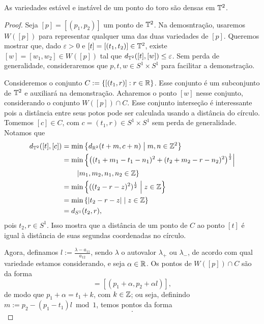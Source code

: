 \begin{proposition}
As variedades estável e instável de um ponto do toro são densas em $\mathbb{T}^2$.	\end{proposition}
\begin{proof}
Seja $[p]=[(p_1,p_2)]$ um ponto de $\mathbb{T}^2$. Na demosntração, usaremos $W([p])$ para representar qualquer uma das duas variedades de $[p]$. Queremos mostrar que, dado $\varepsilon > 0$ e $[t]=[(t_1,t_2)] \in \mathbb{T}^2$, existe $[w]=[w_1,w_2] \in W([p])$ tal que $d_{\mathbb{T}^2}([t],[w]) \leq \varepsilon$. Sem perda de generalidade, consideraremos que $p,t,w \in S^1 \times S^1$ para facilitar a demonstração.

Consideremos o conjunto $C := \{[(t_1,r)] : r \in \mathbb{R} \}$. Esse conjunto é um subconjunto de $\mathbb{T}^2$ e auxiliará na demonstração. Acharemos o ponto $[w]$ nesse conjunto, considerando o conjunto $W([p]) \cap C$. Esse conjunto interseção é interessante pois a distância entre seus potos pode ser calculada usando a distância do círculo. Tomemos $[c] \in C$, com $c=(t_1,r) \in S^1 \times S^1$ sem perda de generalidade. Notamos que
	\begin{align*}
		d_{\mathbb{T}^2}([t],[c])& = \min\left\{{d_{\mathbb{R}^2}(t+m,c+n)}\;\middle\vert\;{m,n \in \mathbb{Z}^2}\right\} \\
			& = \min \left\{ \big((t_1+m_1-t_1-n_1)^2 + (t_2+m_2-r-n_2)^2 \big)^{\frac{1}{2}} \right| \\
			&\qquad \left| m_1,m_2,n_1,n_2 \in \mathbb{Z} \right\} \\
			& = \min\left\{{((t_2-r-z)^2)^{\frac{1}{2}}}\;\middle\vert\;{z \in \mathbb{Z}}\right\} \\
			& = \min\left\{{\left\vert{t_2-r-z}\right\vert}\;\middle\vert\;{z \in \mathbb{Z}}\right\} \\
			& = d_{S^1}(t_2,r),
	\end{align*}
pois $t_2, r \in S^1$. Isso mostra que a distância de um ponto de $C$ ao ponto $[t]$ é igual à distância de suas segundas coordenadas no círculo.

Agora, definamos $l := \frac{\lambda - a_{11}}{a_{12}}$, sendo $\lambda$ o autovalor $\lambda_+$ ou $\lambda_-$, de acordo com qual variedade estamos considerando, e seja $\alpha \in \mathbb{R}$. Os pontos de $W([p]) \cap C$ são da forma
	\begin{equation*}
	[p + \alpha v_\lambda] = [(p_1 + \alpha, p_2 + \alpha l)],
	\end{equation*}
de modo que $p_1 + \alpha = t_1 + k$, com $k \in \mathbb{Z}$; ou seja, definindo $m := p_2 - (p_1 - t_1)l \bmod 1$, temos pontos da forma
	\begin{equation*}
	[(t_1,m + kl)].
	\end{equation*}


\end{proof}
